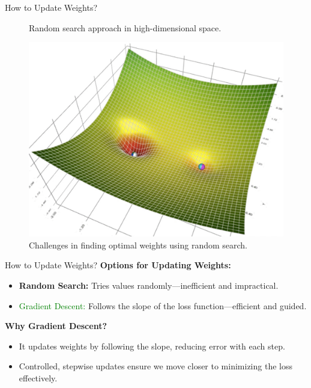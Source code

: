 \documentclass[serif, aspectratio=169]{beamer}
\begin{document}
\begin{frame}{How to Update Weights?}
\begin{figure}[!htb]
\begin{minipage}{0.3\textwidth}
            {\scriptsize Random search approach in high-dimensional space.}
  \end{minipage}\hfill
  \begin{minipage}{0.3\textwidth}
     \centering
     \includegraphics[width=.8\linewidth]{pic/gd3.png}\\
            {\scriptsize Challenges in finding optimal weights using random search.}
  \end{minipage}
\end{figure}
\end{frame}

\begin{frame}{How to Update Weights?}
 \textbf{Options for Updating Weights:}
    \begin{itemize}
        \item \textbf{Random Search:} Tries values randomly—inefficient and impractical.
        \item \textcolor{green}{Gradient Descent:} Follows the slope of the loss function—efficient and guided.
    \end{itemize}
    
    \textbf{Why Gradient Descent?}
    \begin{itemize}
        \item It updates weights by following the slope, reducing error with each step.
        \item Controlled, stepwise updates ensure we move closer to minimizing the loss effectively.
    \end{itemize}
\end{frame}
\end{document}
